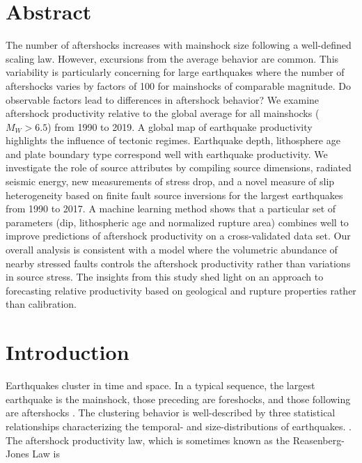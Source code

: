 \documentclass[draft, jgrga]{agujournal2018}
\begin{document}
\newpage

\justify

\section*{Abstract}

 The number of aftershocks increases with mainshock size following a well-defined scaling law. However, excursions from the average behavior are common. This variability is particularly concerning for large earthquakes where the number of aftershocks varies by factors of 100 for mainshocks of comparable magnitude. Do observable factors lead to differences in aftershock behavior? We examine aftershock productivity relative to the global average for all mainshocks ($M_W>6.5$) from 1990 to 2019. A global map of earthquake productivity highlights the influence of tectonic regimes. Earthquake depth, lithosphere age and plate boundary type correspond well with earthquake productivity. We investigate the role of source attributes by compiling source dimensions, radiated seismic energy, new measurements of stress drop, and a novel measure of slip heterogeneity based on finite fault source inversions for the largest earthquakes from 1990 to 2017.  A machine learning method shows that a particular set of parameters (dip, lithospheric age and normalized rupture area) combines well to improve predictions of aftershock productivity on a cross-validated data set. Our overall analysis is consistent with a model where the volumetric abundance of nearby stressed faults controls the aftershock productivity rather than variations in source stress. The insights from this study shed light on an approach to forecasting relative productivity based on geological and rupture properties rather than  calibration.

\section{Introduction}

Earthquakes cluster in time and space. In a typical sequence, the largest earthquake is the mainshock, those preceding are foreshocks, and those following are aftershocks \citep{Omori1895}. The clustering behavior is well-described by three statistical relationships characterizing the temporal- and size-distributions of earthquakes. \citep[e.g.,][]{Ogata1988}. The aftershock productivity law, which is sometimes known as the Reasenberg-Jones Law is
\end{document}
